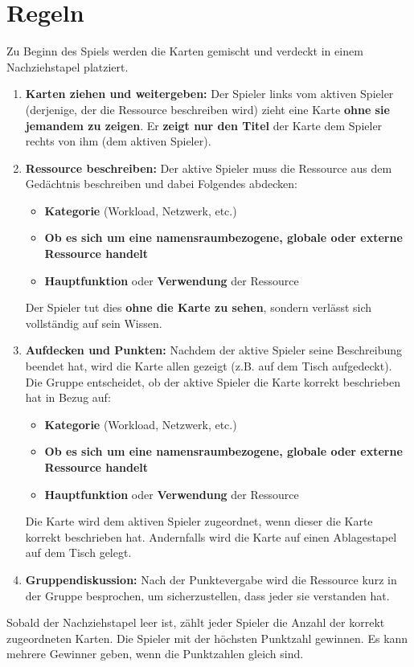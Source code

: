 \documentclass{article}
\begin{document}
\section*{Regeln}
Zu Beginn des Spiels werden die Karten gemischt und verdeckt in einem Nachziehstapel platziert.
\begin{enumerate}[label=\arabic*.]
    \item \textbf{Karten ziehen und weitergeben:} Der Spieler links vom aktiven Spieler (derjenige, der die Ressource beschreiben wird) zieht eine Karte \textbf{ohne sie jemandem zu zeigen}. Er \textbf{zeigt nur den Titel} der Karte dem Spieler rechts von ihm (dem aktiven Spieler).
    
    \item \textbf{Ressource beschreiben:} Der aktive Spieler muss die Ressource aus dem Gedächtnis beschreiben und dabei Folgendes abdecken:
    \begin{itemize}
        \item \textbf{Kategorie} (Workload, Netzwerk, etc.)
        \item \textbf{Ob es sich um eine namensraumbezogene, globale oder externe Ressource handelt}
        \item \textbf{Hauptfunktion} oder \textbf{Verwendung} der Ressource
    \end{itemize}
    Der Spieler tut dies \textbf{ohne die Karte zu sehen}, sondern verlässt sich vollständig auf sein Wissen.
    
    \item \textbf{Aufdecken und Punkten:} Nachdem der aktive Spieler seine Beschreibung beendet hat, wird die Karte allen gezeigt (z.B. auf dem Tisch aufgedeckt). Die Gruppe entscheidet, ob der aktive Spieler die Karte korrekt beschrieben hat in Bezug auf:
    \begin{itemize}
        \item \textbf{Kategorie} (Workload, Netzwerk, etc.)
        \item \textbf{Ob es sich um eine namensraumbezogene, globale oder externe Ressource handelt}
        \item \textbf{Hauptfunktion} oder \textbf{Verwendung} der Ressource
    \end{itemize}
    Die Karte wird dem aktiven Spieler zugeordnet, wenn dieser die Karte korrekt beschrieben hat. Andernfalls wird die Karte auf einen Ablagestapel auf dem Tisch gelegt.
    
    \item \textbf{Gruppendiskussion:} Nach der Punktevergabe wird die Ressource kurz in der Gruppe besprochen, um sicherzustellen, dass jeder sie verstanden hat.
\end{enumerate}
Sobald der Nachziehstapel leer ist, zählt jeder Spieler die Anzahl der korrekt zugeordneten Karten. Die Spieler mit der höchsten Punktzahl gewinnen. Es kann mehrere Gewinner geben, wenn die Punktzahlen gleich sind.
\end{document}
